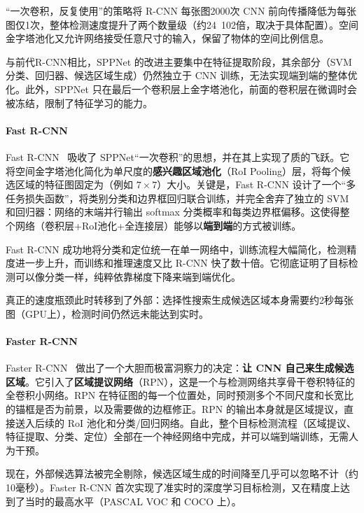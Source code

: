 “一次卷积，反复使用”的策略将 R-CNN 每张图2000次 CNN 前向传播降低为每张图仅1次，整体检测速度提升了两个数量级（约24~102倍，取决于具体配置）。空间金字塔池化又允许网络接受任意尺寸的输入，保留了物体的空间比例信息。

与前代R-CNN相比，SPPNet 的改进主要集中在特征提取阶段，其余部分（SVM分类、回归器、候选区域生成）仍然独立于 CNN 训练，无法实现端到端的整体优化。此外，SPPNet 只在最后一个卷积层上金字塔池化，前面的卷积层在微调时会被冻结，限制了特征学习的能力。

\paragraph{Fast R-CNN}

Fast R-CNN~\cite{7410526} 吸收了 SPPNet“一次卷积”的思想，并在其上实现了质的飞跃。它将空间金字塔池化简化为单尺度的\textbf{感兴趣区域池化}（RoI Pooling）层，将每个候选区域的特征图固定为（例如 $7\times7$）大小。关键是，Fast R-CNN 设计了一个“多任务损失函数”，将类别分类和边界框回归联合训练，并完全舍弃了独立的 SVM 和回归器：网络的末端并行输出 softmax 分类概率和每类边界框偏移。这使得整个网络（卷积层+RoI池化+全连接层）能够以\textbf{端到端}的方式被训练。

Fast R-CNN 成功地将分类和定位统一在单一网络中，训练流程大幅简化，检测精度进一步上升，而训练和推理速度又比 R-CNN 快了数十倍。它彻底证明了目标检测可以像分类一样，纯粹依靠梯度下降来端到端优化。

真正的速度瓶颈此时转移到了外部：选择性搜索生成候选区域本身需要约2秒每张图（GPU上），检测时间仍然远未能达到实时。

\paragraph{Faster R-CNN}

Faster R-CNN~\cite{ren2016fasterrcnnrealtimeobject} 做出了一个大胆而极富洞察力的决定：\textbf{让 CNN 自己来生成候选区域}。它引入了\textbf{区域提议网络}（RPN），这是一个与检测网络共享骨干卷积特征的全卷积小网络。RPN 在特征图的每一个位置处，同时预测多个不同尺度和长宽比的锚框是否为前景，以及需要做的边框修正。RPN 的输出本身就是区域提议，直接送入后续的 RoI 池化和分类/回归网络。自此，整个目标检测流程（区域提议、特征提取、分类、定位）全部在一个神经网络中完成，并可以端到端训练，无需人为干预。

现在，外部候选算法被完全剔除，候选区域生成的时间降至几乎可以忽略不计（约10毫秒）。Faster R-CNN 首次实现了准实时的深度学习目标检测，又在精度上达到了当时的最高水平（PASCAL VOC 和 COCO 上）。

